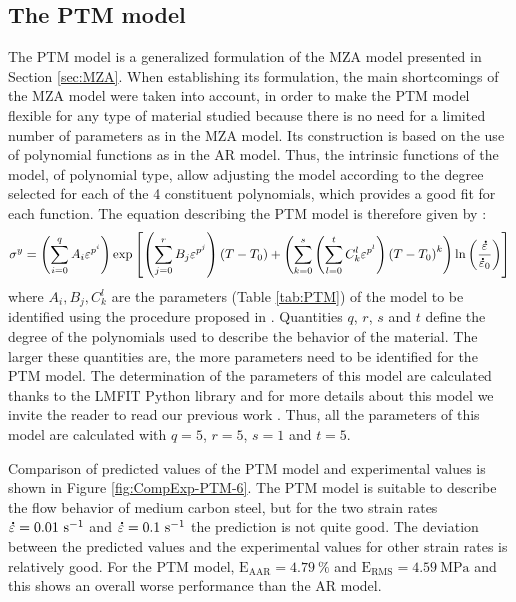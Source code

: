 \documentclass[twoside,english,1p,final,sort&compress]{elsarticle}
\theoremstyle{plain}
\DeclareRobustCommand{\mdot}[1]{\accentset{\mbox{\bfseries .}}{#1}}
\DeclareRobustCommand{\RMSE}{\text{E}_\text{RMS}}
\DeclareRobustCommand{\AARE}{\text{E}_\text{AAR}}
\DeclareRobustCommand{\ps}{\text{s}^{-1}}
\DeclareRobustCommand{\MPa}{\text{MPa}}
\begin{document}
\subsection{The PTM model\label{sec:PTM}}

The PTM model \cite{TizeMha-2022} is a generalized formulation of the MZA model presented in Section \ref{sec:MZA}.
When establishing its formulation, the main shortcomings of the MZA model were taken into account, in order to make the PTM model flexible for any type of material studied because there is no need for a limited number of parameters as in the MZA model.
Its construction is based on the use of polynomial functions as in the AR model.
Thus, the intrinsic functions of the model, of polynomial type, allow adjusting the model according to the degree selected for each of the 4 constituent polynomials, which provides a good fit for each function.
The equation describing the PTM model is therefore given by :
\begin{equation}
\label{eq:PTM-model}
\sigma^y = \left(\sum_{i=0}^{q}{A_i\varepsilon^{p^i}}\right) \exp\left[\left(\sum_{j=0}^{r}{B_j\varepsilon^{p^j}}\right)\left(T-T_0\right) + \left(\sum_{k=0}^{s}\left(\sum_{l=0}^{t}{C_k^l\varepsilon^{p^l}} \right)\left(T-T_0\right)^k \right)\ln\left( \frac{\mdot\varepsilon}{\mdot{\varepsilon}_0}\right)\right]
\end{equation}
where $A_i, B_j, C_k^l$ are the parameters (Table \ref{tab:PTM}) of the model to be identified using the procedure proposed in  \cite{TizeMha-2022}.
Quantities $q$, $r$, $s$ and $t$ define the degree of the polynomials used to describe the behavior of the material.
The larger these quantities are, the more parameters need to be identified for the PTM model.
The determination of the parameters of this model are calculated thanks to the LMFIT Python library \cite{Newville-2016} and for more details about this model  we invite the reader to read our previous work \cite{TizeMha-2022}.
Thus, all the parameters of this model are calculated with $q=5$, $r=5$, $s=1$ and $t=5$.

Comparison of predicted values of the PTM model and experimental values is shown in Figure \ref{fig:CompExp-PTM-6}.
The PTM model is suitable to describe the flow behavior of medium carbon steel, but for the two strain rates $\mdot\varepsilon=0.01~\ps$ and $\mdot\varepsilon=0.1~\ps$ the prediction is not quite good.
The deviation between the predicted values and the experimental values for other strain rates is relatively good.
For the PTM model, $\AARE=4.79~\%$ and $\RMSE=4.59~\MPa$ and this shows an overall worse performance than the AR model.
\end{document}
